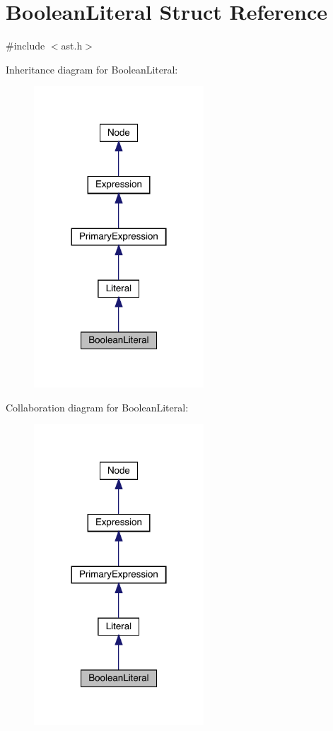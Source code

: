 \hypertarget{struct_boolean_literal}{}\section{Boolean\+Literal Struct Reference}
\label{struct_boolean_literal}


{\ttfamily \#include $<$ast.\+h$>$}



Inheritance diagram for Boolean\+Literal\+:\nopagebreak
\begin{figure}[H]
\begin{center}
\leavevmode
\includegraphics[width=180pt]{struct_boolean_literal__inherit__graph}
\end{center}
\end{figure}


Collaboration diagram for Boolean\+Literal\+:\nopagebreak
\begin{figure}[H]
\begin{center}
\leavevmode
\includegraphics[width=180pt]{struct_boolean_literal__coll__graph}
\end{center}
\end{figure}
